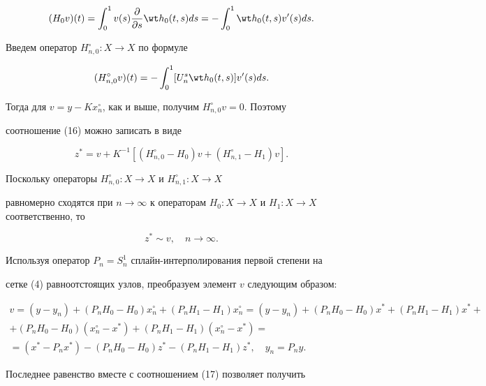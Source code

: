 $$ 


(H_0v)(t)=\int^1_0v(s)\frac{\partial}{\partial s}\wt h_0(t,s)ds= 


-\int^1_0\wt h_0(t,s)v'(s)ds. 


$$ 


Введем оператор $H^\circ_{n,0}:X\to X$ по формуле 


$$ 


(H^\circ_{n,0}v)(t)=-\int^1_0[U^s_n\wt h_0(t,s)]v'(s)ds. 


$$ 


Тогда для $v=y-Kx^\circ_n$, как и выше, получим $H^\circ_{n,0}v=0$. Поэтому 


соотношение (16) можно записать в виде 


$$ 


z^*=v+K^{-1}[(H^\circ_{n,0}-H_0)v+(H^\circ_{n,1}-H_1)v]. 


$$ 


Поскольку операторы $H^\circ_{n,0}:X\to X$ и $H^\circ_{n,1}:X\to X$ 


равномерно сходятся при $n\to\infty$ к операторам $H_0:X\to X$ и $H_1:X\to 


X$ соответственно, то 


\begin{equation} 


z^*\sim v,\quad n\to\infty. 


\end{equation} 


Используя оператор $P_n=S^1_n$ сплайн-интерполирования первой степени на 


сетке (4) равноотстоящих узлов, преобразуем элемент $v$ следующим образом: 


\begin{gather*} 


v=(y-y_n)+(P_n H_0-H_0)x^\circ_n+(P_n H_1-H_1)x^\circ_n= 


(y-y_n)+(P_n H_0-H_0)x^*+(P_n H_1-H_1)x^*+ \\ 


% 


+(P_n H_0-H_0)(x^\circ_n-x^*)+(P_n H_1-H_1)(x^\circ_n-x^*)=\\ 


% 


=(x^*-P_n x^*)-(P_n H_0-H_0)z^*-(P_n H_1-H_1)z^*,\quad y_n=P_n y. 


\end{gather*} 


Последнее равенство вместе с соотношением (17) позволяет получить 


